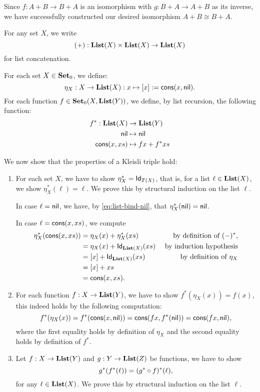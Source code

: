 \begin{solution}
\noindent
Since $f : A+B \to B+A$ is an isomorphism with $g : B+A \to A+B$ as its inverse, we have successfully constructed our desired isomorphism $A+B \cong B+A$.
\end{solution}


\begin{solution}
  \label{sol:kleisli_triple_list}
  For any set $X$, we write
  \[ (+) : \List(X) \times \List(X) \to \List(X)\]
  for list concatenation.

  For each set $X\in\Ob \SET$, we define:
  \[
    \eta_X : X \to \List(X) : x\mapsto [x] := \cons(x,\nil).
  \]
  For each function $f\in\CHom{\Ob \SET}{X}{\List(Y)}$, we define, by list recursion, the following function:
  \begin{align}
    f^{*} : \List(X) &\to \List(Y) 
    \\
    \nil & \mapsto \nil  \label{eq:list-bind-nil}
    \\
    \cons(x,xs) &\mapsto fx + f^*xs  \label{eq:list-bind-cons}
  \end{align}
  
We now show that the properties of a Kleisli triple hold:
\begin{enumerate}
\item For each set $X$, we have to show $\eta_X^{*} = \Id[T(X)]$,
  that is, for a list $\ell \in \List (X)$, we show $\eta_X^{*}(\ell) = \ell$.
  We prove this by structural induction on the list $\ell$.
  
  In case $\ell = \nil$, we have, by \cref{eq:list-bind-nil}, that $\eta_X^{*}(\nil) = \nil$.
  
  In case $\ell = \cons(x,xs)$, we compute
  \begin{align*}
    \eta_X^{*}(\cons(x,xs)) &= \eta_X(x) + \eta_X^{*}(xs) & \text{ by definition of } (-)^{*},
    \\
                            &= \eta_X(x) + \Id[\List(X)](xs)  & \text{ by induction hypothesis}
    \\
                            &= [x] + \Id[\List(X)](xs) & \text{ by definition of } \eta_X
    \\
                            &= [x] + xs
    \\
                            &= \cons(x,xs).
  \end{align*}
  
  

\item For each function $f:X\to \List(Y)$, we have to show $f^{*}(\eta_X(x)) = f(x)$, this indeed holds by the following computation:
\[
f^{*}(\eta_X(x)) = f^{*}(\cons(x,\nil)) = \cons(fx, f^{*}(\nil)) = \cons(fx, \nil),
\]
where the first equality holds by definition of $\eta_X$ and the second equality holds by definition of $f^{*}$.
\item Let $f:X\to \List(Y)$ and $g:Y\to \List(Z)$ be functions, we have to show 
\[
g^{*}(f^{*}(\ell)) = (\co{f}{g^{*}})^{*}(\ell),
\] 
for any $\ell \in \List(X)$.
 We prove this by structural induction on the list $\ell$.


\end{enumerate}
\end{solution}
